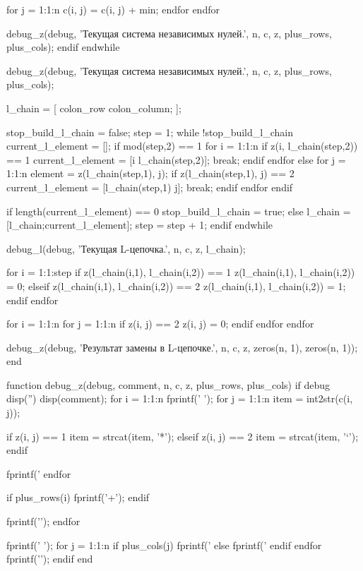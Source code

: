         for j = 1:1:n
          c(i, j) = c(i, j) + min;
        endfor
      endfor

      debug_z(debug, 'Текущая система независимых нулей.', n, c, z, plus_rows, plus_cols);
    endif
  endwhile

  debug_z(debug, 'Текущая система независимых нулей.', n, c, z, plus_rows, plus_cols);

  l_chain = [
    colon_row colon_column;
  ];

  stop_build_l_chain = false;
  step = 1;
  while !stop_build_l_chain
    current_l_element = [];
    if mod(step,2) == 1
      for i = 1:1:n
        if z(i, l_chain(step,2)) == 1
          current_l_element = [i l_chain(step,2)];
          break;
        endif
      endfor
    else
      for j = 1:1:n
        element = z(l_chain(step,1), j);
        if z(l_chain(step,1), j) == 2
          current_l_element = [l_chain(step,1) j];
          break;
        endif
      endfor
    endif

    if length(current_l_element) == 0
      stop_build_l_chain = true;
    else
      l_chain = [l_chain;current_l_element];
      step = step + 1;
    endif
  endwhile

  debug_l(debug, 'Текущая L-цепочка.', n, c, z, l_chain);

  for i = 1:1:step
    if z(l_chain(i,1), l_chain(i,2)) == 1
      z(l_chain(i,1), l_chain(i,2)) = 0;
    elseif z(l_chain(i,1), l_chain(i,2)) == 2
      z(l_chain(i,1), l_chain(i,2)) = 1;
    endif
  endfor

  for i = 1:1:n
    for j = 1:1:n
      if z(i, j) == 2
        z(i, j) = 0;
      endif
    endfor
  endfor

  debug_z(debug, 'Результат замены в L-цепочке.', n, c, z, zeros(n, 1), zeros(n, 1));
end

function debug_z(debug, comment, n, c, z, plus_rows, plus_cols)
  if debug
    disp('')
    disp(comment);
    for i = 1:1:n
      fprintf('   ');
      for j = 1:1:n
        item = int2str(c(i, j));

        if z(i, j) == 1
          item = strcat(item, '*');
        elseif z(i, j) == 2
          item = strcat(item, '`');
        endif

        fprintf('%
      endfor

      if plus_rows(i)
        fprintf('+');
      endif

      fprintf('\n');
    endfor

    fprintf('   ');
    for j = 1:1:n
      if plus_cols(j)
        fprintf('%
      else
        fprintf('%
      endif
    endfor
    fprintf('\n');
  endif
end

